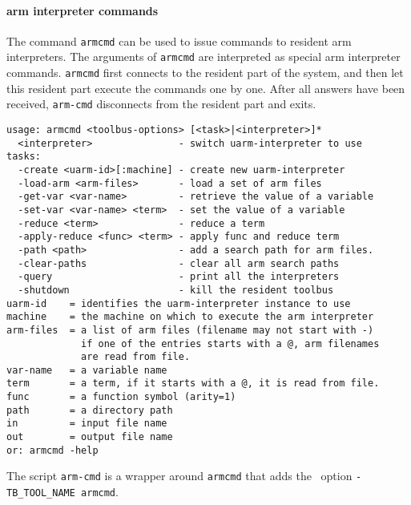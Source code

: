\paragraph{arm interpreter commands}
The command {\tt armcmd} can be used to issue commands to resident
arm interpreters. The arguments of {\tt armcmd} are interpreted
as special arm interpreter commands. {\tt armcmd} first connects to
the resident part of the system, and then let this resident part
execute the commands one by one. After all answers have been received,
{\tt arm-cmd} disconnects from the resident part and exits.
\begin{verbatim}
usage: armcmd <toolbus-options> [<task>|<interpreter>]*
  <interpreter>               - switch uarm-interpreter to use
tasks:
  -create <uarm-id>[:machine] - create new uarm-interpreter
  -load-arm <arm-files>       - load a set of arm files
  -get-var <var-name>         - retrieve the value of a variable
  -set-var <var-name> <term>  - set the value of a variable
  -reduce <term>              - reduce a term
  -apply-reduce <func> <term> - apply func and reduce term
  -path <path>                - add a search path for arm files.
  -clear-paths                - clear all arm search paths
  -query                      - print all the interpreters
  -shutdown                   - kill the resident toolbus
uarm-id    = identifies the uarm-interpreter instance to use
machine    = the machine on which to execute the arm interpreter
arm-files  = a list of arm files (filename may not start with -)
             if one of the entries starts with a @, arm filenames
             are read from file.
var-name   = a variable name
term       = a term, if it starts with a @, it is read from file.
func       = a function symbol (arity=1)
path       = a directory path
in         = input file name
out        = output file name
or: armcmd -help
\end{verbatim}
The script {\tt arm-cmd} is a wrapper around {\tt armcmd} that adds
the \TB\ option {\tt -TB\_TOOL\_NAME armcmd}.




